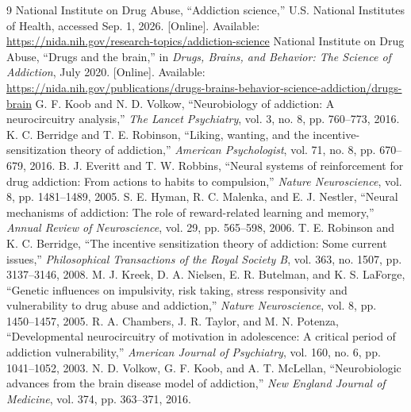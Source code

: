 \documentclass[conference]{IEEEtran}
\begin{document}
\begin{thebibliography}{9}
 National Institute on Drug Abuse, ``Addiction science,'' U.S. National Institutes of Health, accessed Sep. 1, 2026. [Online]. Available: \url{https://nida.nih.gov/research-topics/addiction-science}
 National Institute on Drug Abuse, ``Drugs and the brain,'' in \textit{Drugs, Brains, and Behavior: The Science of Addiction}, July 2020. [Online]. Available: \url{https://nida.nih.gov/publications/drugs-brains-behavior-science-addiction/drugs-brain}
 G. F. Koob and N. D. Volkow, ``Neurobiology of addiction: A neurocircuitry analysis,'' \textit{The Lancet Psychiatry}, vol. 3, no. 8, pp. 760--773, 2016.
 K. C. Berridge and T. E. Robinson, ``Liking, wanting, and the incentive-sensitization theory of addiction,'' \textit{American Psychologist}, vol. 71, no. 8, pp. 670--679, 2016.
 B. J. Everitt and T. W. Robbins, ``Neural systems of reinforcement for drug addiction: From actions to habits to compulsion,'' \textit{Nature Neuroscience}, vol. 8, pp. 1481--1489, 2005.
 S. E. Hyman, R. C. Malenka, and E. J. Nestler, ``Neural mechanisms of addiction: The role of reward-related learning and memory,'' \textit{Annual Review of Neuroscience}, vol. 29, pp. 565--598, 2006.
 T. E. Robinson and K. C. Berridge, ``The incentive sensitization theory of addiction: Some current issues,'' \textit{Philosophical Transactions of the Royal Society B}, vol. 363, no. 1507, pp. 3137--3146, 2008.
 M. J. Kreek, D. A. Nielsen, E. R. Butelman, and K. S. LaForge, ``Genetic influences on impulsivity, risk taking, stress responsivity and vulnerability to drug abuse and addiction,'' \textit{Nature Neuroscience}, vol. 8, pp. 1450--1457, 2005.
 R. A. Chambers, J. R. Taylor, and M. N. Potenza, ``Developmental neurocircuitry of motivation in adolescence: A critical period of addiction vulnerability,'' \textit{American Journal of Psychiatry}, vol. 160, no. 6, pp. 1041--1052, 2003.
 N. D. Volkow, G. F. Koob, and A. T. McLellan, ``Neurobiologic advances from the brain disease model of addiction,'' \textit{New England Journal of Medicine}, vol. 374, pp. 363--371, 2016.
\end{thebibliography}
\end{document}
